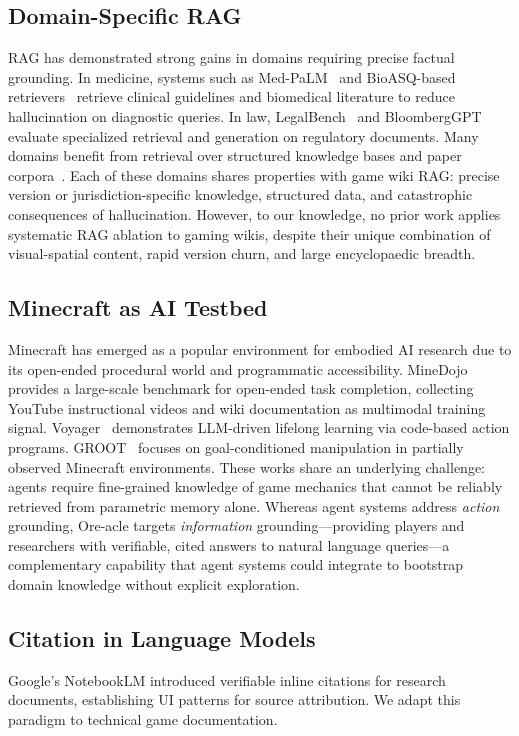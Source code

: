 \documentclass[11pt,a4paper]{article}
\begin{document}
\subsection{Domain-Specific RAG}
RAG has demonstrated strong gains in domains requiring precise factual grounding. In medicine, systems such as Med-PaLM~\cite{singhal2023medpalm} and BioASQ-based retrievers~\cite{nentidis2023bioasq} retrieve clinical guidelines and biomedical literature to reduce hallucination on diagnostic queries. In law, LegalBench~\cite{guha2023legalbench} and BloombergGPT~\cite{wu2023bloomberggpt} evaluate specialized retrieval and generation on regulatory documents. Many domains benefit from retrieval over structured knowledge bases and paper corpora~\cite{shi2023repug}. Each of these domains shares properties with game wiki RAG: precise version or jurisdiction-specific knowledge, structured data, and catastrophic consequences of hallucination. However, to our knowledge, no prior work applies systematic RAG ablation to gaming wikis, despite their unique combination of visual-spatial content, rapid version churn, and large encyclopaedic breadth.

\subsection{Minecraft as AI Testbed}
Minecraft has emerged as a popular environment for embodied AI research due to its open-ended procedural world and programmatic accessibility. MineDojo~\cite{fan2022minedojo} provides a large-scale benchmark for open-ended task completion, collecting YouTube instructional videos and wiki documentation as multimodal training signal. Voyager~\cite{wang2023voyager} demonstrates LLM-driven lifelong learning via code-based action programs. GROOT~\cite{cai2023groot} focuses on goal-conditioned manipulation in partially observed Minecraft environments. These works share an underlying challenge: agents require fine-grained knowledge of game mechanics that cannot be reliably retrieved from parametric memory alone. Whereas agent systems address \textit{action} grounding, Ore-acle targets \textit{information} grounding---providing players and researchers with verifiable, cited answers to natural language queries---a complementary capability that agent systems could integrate to bootstrap domain knowledge without explicit exploration.

\subsection{Citation in Language Models}
Google's NotebookLM \cite{notebooklm2023} introduced verifiable inline citations for research documents, establishing UI patterns for source attribution. We adapt this paradigm to technical game documentation.
\end{document}
